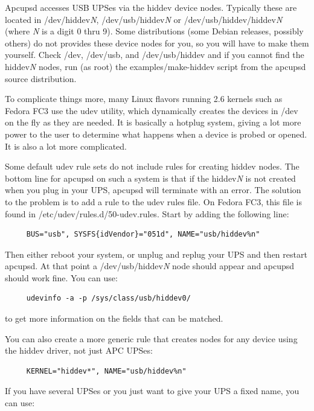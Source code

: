 Apcupsd accesses USB UPSes via the hiddev device nodes. Typically these are
located in /dev/hiddev{\it N}, /dev/usb/hiddev{\it N} or
/dev/usb/hiddev/hiddev{\it N} (where {\it N} is a digit 0 thru 9). Some 
distributions (some Debian releases, possibly others) do not provides these
device nodes for you, so you will have to make them yourself. Check /dev, 
/dev/usb, and /dev/usb/hiddev and if you  cannot find the hiddev{\it N} nodes,
run (as root) the examples/make-hiddev script from the apcupsd source distribution.

To complicate things more, many Linux flavors running 2.6 kernels such as
Fedora FC3 use the udev utility, which dynamically creates the devices in /dev
on the fly as they are needed. It is basically a hotplug system, giving a lot
more power to the user to determine what happens when a device is probed or 
opened. It is also a lot more complicated.  

Some default udev rule sets do not include rules for creating hiddev nodes.
The bottom line for apcupsd on such a system is that if the
hiddev{\it N} is not created when you plug in your UPS, apcupsd will terminate
with an error. The solution to the problem is to add a rule to the udev rules
file.  On Fedora FC3, this file is found in /etc/udev/rules.d/50-udev.rules.
Start by adding the following line:

\begin{verbatim}
     BUS="usb", SYSFS{idVendor}="051d", NAME="usb/hiddev%n"
\end{verbatim}

Then either reboot your system, or unplug and replug your UPS and then restart
apcupsd. At that point a /dev/usb/hiddev{\it N} node should appear and apcupsd
should work fine.  You can use: 

\begin{verbatim}
     udevinfo -a -p /sys/class/usb/hiddev0/
\end{verbatim}

to get more information on the fields that can be matched.

You can also create a more generic rule that creates nodes for any device
using the hiddev driver, not just APC UPSes:

\begin{verbatim}
     KERNEL="hiddev*", NAME="usb/hiddev%n"
\end{verbatim}

If you have several UPSes or you just want to give your UPS a fixed name, you
can use: 

